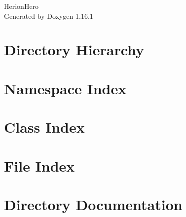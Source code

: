 \documentclass[twoside]{book}
\newcommand{\+}{\discretionary{\mbox{\scriptsize$\hookleftarrow$}}{}{}}
\newcommand{\clearemptydoublepage}{%
    \newpage{\pagestyle{empty}\cleardoublepage}%
  }
\begin{document}
  \raggedbottom
    \hypersetup{pageanchor=false,
                bookmarksnumbered=true,
                pdfencoding=unicode
               }
  \begin{titlepage}
  \vspace*{7cm}
  \begin{center}%
  {\Large Herion\+Hero}\\
  \vspace*{1cm}
  {\large Generated by Doxygen 1.16.1}\\
  \end{center}
  \end{titlepage}
  \clearemptydoublepage
  \tableofcontents
  \clearemptydoublepage
  \hypersetup{pageanchor=true}
\chapter{Directory Hierarchy}

\chapter{Namespace Index}

\chapter{Class Index}

\chapter{File Index}

\chapter{Directory Documentation}






















\end{document}
